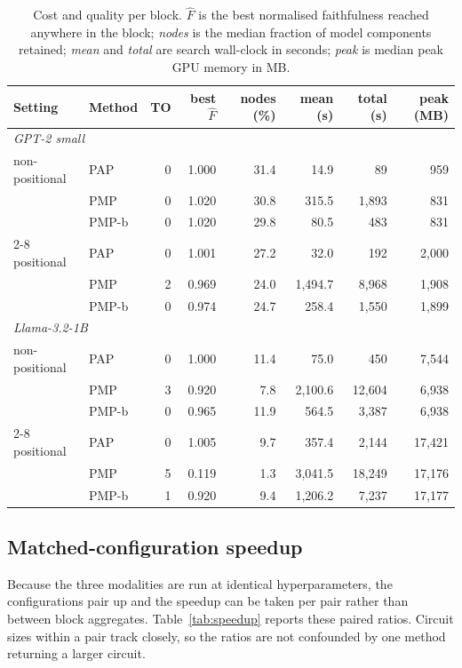 \documentclass[11pt,a4paper]{article}
\begin{document}
\begin{table}[h]
\centering
\small
\caption{Cost and quality per block. $\widehat{F}$ is the best normalised faithfulness reached
anywhere in the block; \emph{nodes} is the median fraction of model components retained;
\emph{mean} and \emph{total} are search wall-clock in seconds; \emph{peak} is median peak GPU
memory in MB.}
\label{tab:modality}
\begin{tabular}{llrrrrrr}
\toprule
Setting & Method & TO & best $\widehat{F}$ & nodes (\%) & mean (s) & total (s) & peak (MB) \\
\midrule
\multicolumn{8}{l}{\itshape GPT-2 small} \\
\quad non-positional & PAP & 0 & 1.000 & 31.4 & 14.9 & 89 & 959 \\
\quad  & PMP & 0 & 1.020 & 30.8 & 315.5 & 1,893 & 831 \\
\quad  & PMP-b & 0 & 1.020 & 29.8 & 80.5 & 483 & 831 \\
\cmidrule(l){2-8}
\quad positional & PAP & 0 & 1.001 & 27.2 & 32.0 & 192 & 2,000 \\
\quad  & PMP & 2 & 0.969 & 24.0 & 1,494.7 & 8,968 & 1,908 \\
\quad  & PMP-b & 0 & 0.974 & 24.7 & 258.4 & 1,550 & 1,899 \\
\midrule
\multicolumn{8}{l}{\itshape Llama-3.2-1B} \\
\quad non-positional & PAP & 0 & 1.000 & 11.4 & 75.0 & 450 & 7,544 \\
\quad  & PMP & 3 & 0.920 & 7.8 & 2,100.6 & 12,604 & 6,938 \\
\quad  & PMP-b & 0 & 0.965 & 11.9 & 564.5 & 3,387 & 6,938 \\
\cmidrule(l){2-8}
\quad positional & PAP & 0 & 1.005 & 9.7 & 357.4 & 2,144 & 17,421 \\
\quad  & PMP & 5 & 0.119 & 1.3 & 3,041.5 & 18,249 & 17,176 \\
\quad  & PMP-b & 1 & 0.920 & 9.4 & 1,206.2 & 7,237 & 17,177 \\
\bottomrule
\end{tabular}
\end{table}

\subsection{Matched-configuration speedup}

Because the three modalities are run at identical hyperparameters, the configurations pair up
and the speedup can be taken per pair rather than between block aggregates. Table~\ref{tab:speedup}
reports these paired ratios. Circuit sizes within a pair track closely, so the ratios are not
confounded by one method returning a larger circuit.
\end{document}
